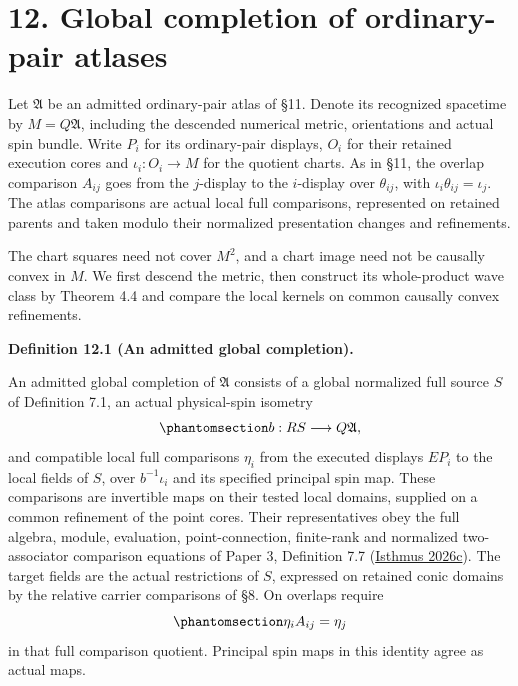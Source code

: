 \documentclass[
  english,
  11pt,
  reqno]{amsart}
\makeatletter
\newcommand{\pandocstatementheading}[1]{%
  \par\if@nobreak\else
    \addpenalty{\@beginparpenalty}%
    \addvspace{.5\baselineskip plus .2\baselineskip minus .2\baselineskip}%
  \fi
  {\normalfont\bfseries #1\par}%
  \nobreak\@afterindenttrue\@afterheading
}
\makeatother
\begin{document}
\protect{}\label{sec:ordinary-atlas-global-completion}

\section{12. Global completion of ordinary-pair
atlases}\label{global-completion-of-ordinary-pair-atlases}

Let \(\mathfrak A\) be an admitted ordinary-pair atlas of §11. Denote
its recognized spacetime by \(M=Q\mathfrak A\), including the descended
numerical metric, orientations and actual spin bundle. Write \(P_i\) for
its ordinary-pair displays, \(O_i\) for their retained execution cores
and \(\iota_i:O_i\to M\) for the quotient charts. As in §11, the overlap
comparison \(A_{ij}\) goes from the \(j\)-display to the \(i\)-display
over \(\theta_{ij}\), with \(\iota_i\theta_{ij}=\iota_j\). The atlas
comparisons are actual local full comparisons, represented on retained
parents and taken modulo their normalized presentation changes and
refinements.

The chart squares need not cover \(M^2\), and a chart image need not be
causally convex in \(M\). We first descend the metric, then construct
its whole-product wave class by Theorem 4.4 and compare the local
kernels on common causally convex refinements.

\pandocstatementheading{\protect{}\label{def:ordinary-atlas-admitted-completion}Definition 12.1 (An admitted global completion).}

An admitted global completion of \(\mathfrak A\) consists of a global
normalized full source \(S\) of Definition 7.1, an actual physical-spin
isometry
\begin{equation}\protect\phantomsection\label{eq:ordinary-atlas-completion-marking}{
b:RS\longrightarrow Q\mathfrak A,
}\end{equation} and compatible local full comparisons \(\eta_i\) from
the executed displays \(E P_i\) to the local fields of \(S\), over
\(b^{-1}\iota_i\) and its specified principal spin map. These
comparisons are invertible maps on their tested local domains, supplied
on a common refinement of the point cores. Their representatives obey
the full algebra, module, evaluation, point-connection, finite-rank and
normalized two-associator comparison equations of Paper 3, Definition
7.7 (\hyperref[ref-IsthmusSmooth2026]{Isthmus 2026c}). The target fields
are the actual restrictions of \(S\), expressed on retained conic
domains by the relative carrier comparisons of §8. On overlaps require
\begin{equation}\protect\phantomsection\label{eq:ordinary-atlas-completion-overlaps}{
\eta_i A_{ij}=\eta_j
}\end{equation} in that full comparison quotient. Principal spin maps in
this identity agree as actual maps.
\end{document}
